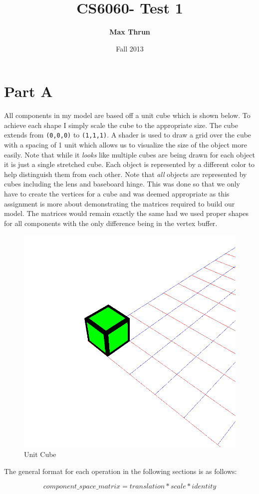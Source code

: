 \documentclass[12pt]{article}
\date{Fall 2013}
\title{
    \vspace{2in}
    \textmd{\textbf{CS6060- Test 1}}\\
    \vspace{4in}
}
\author{\textbf{Max Thrun}}
\begin{document}
\maketitle
\newpage

\section*{Part A}

    All components in my model are based off a unit cube which is shown below.
    To achieve each shape I simply scale the cube to the appropriate size.  The
    cube extends from \texttt{(0,0,0)} to \texttt{(1,1,1)}. A shader is used to
    draw a grid over the cube with a spacing of 1 unit which allows us to
    visualize the size of the object more easily. Note that while it
    \emph{looks} like multiple cubes are being drawn for each object it is just
    a single stretched cube. Each object is represented by a different color to
    help distinguish them from each other. Note that \emph{all} objects are
    represented by cubes including the lens and baseboard hinge. This was done
    so that we only have to create the vertices for a cube and was deemed
    appropriate as this assignment is more about demonstrating the matrices
    required to build our model. The matrices would remain exactly the same had
    we used proper shapes for all components with the only difference being in
    the vertex buffer.

    \begin{figure}[H]
        \centering
        \includegraphics[width=0.5\linewidth]{../images/cube.png}
        \caption{Unit Cube}
    \end{figure}

    The general format for each operation in the following sections is as follows:

    $$ component\_space\_matrix = translation * scale * identity $$
\end{document}
